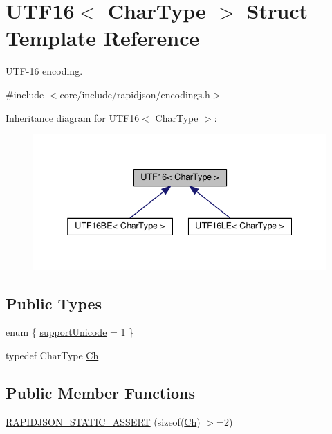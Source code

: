 \hypertarget{structUTF16}{}\section{U\+T\+F16$<$ Char\+Type $>$ Struct Template Reference}
\label{structUTF16}


U\+T\+F-\/16 encoding.  




{\ttfamily \#include $<$core/include/rapidjson/encodings.\+h$>$}



Inheritance diagram for U\+T\+F16$<$ Char\+Type $>$\+:
\nopagebreak
\begin{figure}[H]
\begin{center}
\leavevmode
\includegraphics[width=338pt]{structUTF16__inherit__graph}
\end{center}
\end{figure}
\subsection*{Public Types}
\begin{DoxyCompactItemize}
\item 
enum \{ \hyperlink{structUTF16_a286def80fa945e4d43d52fd398f981daa98b69a56ef3548af9741fff3fcb7b28c}{support\+Unicode} = 1
 \}
\item 
typedef Char\+Type \hyperlink{structUTF16_a811680d50447c98be4fd94c0a27504bb}{Ch}
\end{DoxyCompactItemize}
\subsection*{Public Member Functions}
\begin{DoxyCompactItemize}
\item 
\hyperlink{structUTF16_a04aeeefa5dcba7c5156bc78a5c1f1557}{R\+A\+P\+I\+D\+J\+S\+O\+N\+\_\+\+S\+T\+A\+T\+I\+C\+\_\+\+A\+S\+S\+E\+RT} (sizeof(\hyperlink{structUTF16_a811680d50447c98be4fd94c0a27504bb}{Ch}) $>$=2)
\end{DoxyCompactItemize}
